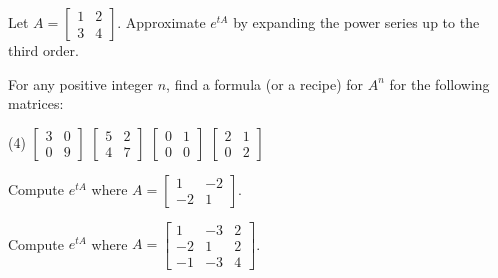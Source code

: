 \begin{exercise}
Let $A = \left[ \begin{smallmatrix}
1 & 2 \\
3 & 4 
\end{smallmatrix} \right]$.
Approximate $e^{tA}$ by expanding the power series
up to the third order.
\end{exercise}

\begin{exercise}
For any positive integer $n$,
find a formula (or a recipe) for $A^n$ for the following matrices:
\begin{tasks}(4)
\task
$
\begin{bmatrix}
3 & 0 \\ 0 & 9
\end{bmatrix}
$
\task
$
\begin{bmatrix}
5 & 2 \\ 4 & 7
\end{bmatrix}
$
\task
$
\begin{bmatrix}
0 & 1 \\ 0 & 0
\end{bmatrix}
$
\task
$
\begin{bmatrix}
2 & 1 \\ 0 & 2
\end{bmatrix}
$
\end{tasks}
\end{exercise}

\setcounter{exercise}{100}

\begin{exercise}
Compute
$e^{tA}$ where
$A=\left[ \begin{smallmatrix}
1 & -2 \\
-2 & 1 
\end{smallmatrix}\right]$.
\end{exercise}

\begin{exercise}
Compute
$e^{tA}$ where
$A=\left[ \begin{smallmatrix}
1 & -3 & 2 \\
-2 & 1 & 2 \\
-1 & -3 & 4
\end{smallmatrix}\right]$.
\end{exercise}


